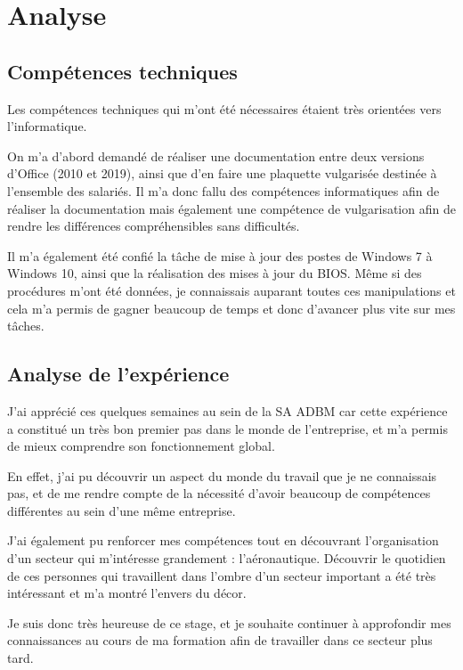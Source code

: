 \chapter{Analyse}


\section{Compétences techniques}

Les compétences techniques qui m'ont été nécessaires étaient très orientées vers l'informatique.

On m'a d'abord demandé de réaliser une documentation entre deux versions d'Office (2010 et 2019), ainsi que d'en faire une plaquette vulgarisée destinée à l'ensemble des salariés.
Il m'a donc fallu des compétences informatiques afin de réaliser la documentation mais également une compétence de vulgarisation afin de rendre les différences compréhensibles sans difficultés.

Il m'a également été confié la tâche de mise à jour des postes de Windows 7 à Windows 10, ainsi que la réalisation des mises à jour du BIOS.
Même si des procédures m'ont été données, je connaissais auparant toutes ces manipulations et cela m'a permis de gagner beaucoup de temps et donc d'avancer plus vite sur mes tâches.

\section{Analyse de l'expérience}

J'ai apprécié ces quelques semaines au sein de la SA ADBM car cette expérience a constitué un très bon premier pas dans le monde de l'entreprise, et m'a permis de mieux comprendre son fonctionnement global.

En effet, j'ai pu découvrir un aspect du monde du travail que je ne connaissais pas, et de me rendre compte de la nécessité d'avoir beaucoup de compétences différentes au sein d'une même entreprise.

J'ai également pu renforcer mes compétences tout en découvrant l'organisation d'un secteur qui m'intéresse grandement : l'aéronautique. Découvrir le quotidien de ces personnes qui travaillent dans l'ombre d'un secteur important a été très intéressant et m'a montré l'envers du décor.

Je suis donc très heureuse de ce stage, et je souhaite continuer à approfondir mes connaissances au cours de ma formation afin de travailler dans ce secteur plus tard.


